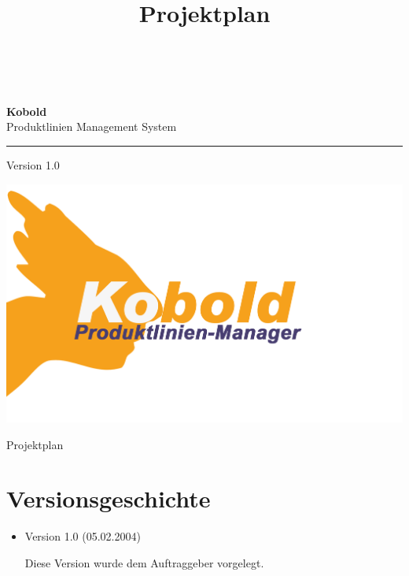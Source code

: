 \documentclass[a4paper,titlepage,12pt,ngerman]{scrbook}
\title {\huge \product\\[0.5cm]\large Projektplan \\[0.5cm] \version
  \\[1cm] \Large \company}
\newcommand\version{Version 1.0\xspace}
\begin{document}

\begin{titlepage}
\renewcommand{\thefootnote}{\fnsymbol{footnote}}
{\Huge
\raggedright
\textbf{\bf Kobold} \\
\huge Produktlinien Management System
\rule{\textwidth}{0.75pt}
\par
}
\begin{flushleft}
\normalsize
\version
\end{flushleft}

\vspace*{3cm}
\begin{center}
\includegraphics[width=15cm]{../common/logo-color.png}
\end{center}
\vfill

{\parindent=0cm
\Huge Projektplan
}


\setcounter{footnote}{0}
\end{titlepage}


\section*{Versionsgeschichte}

\begin{itemize}

\item Version 1.0 (05.02.2004)

  Diese Version wurde dem Auftraggeber vorgelegt.

\end{itemize}
\end{document}

